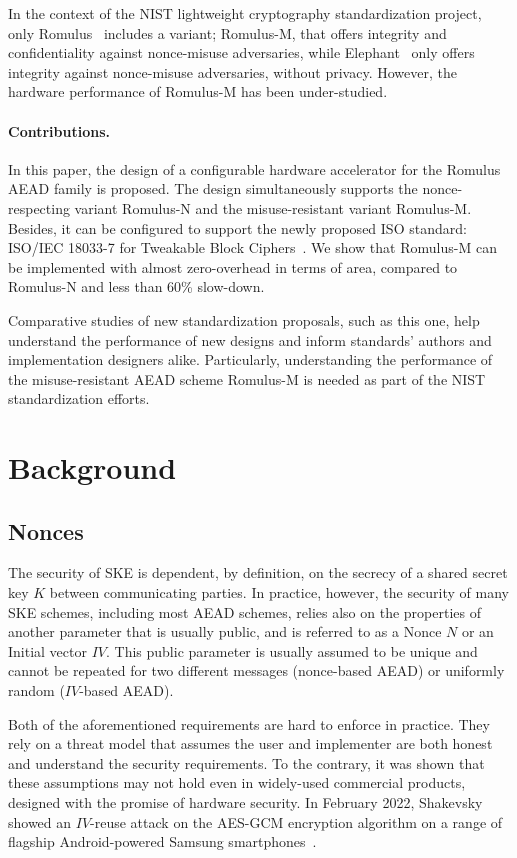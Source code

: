 \documentclass[conference]{IEEEtran}
\begin{document}
In the context of the NIST lightweight cryptography standardization project, only Romulus~\cite{iwataromulus} includes a variant; Romulus-M, that offers integrity and confidentiality against nonce-misuse adversaries, while Elephant~\cite{dobraunig2019elephant} only offers integrity against nonce-misuse adversaries, without privacy. However, the hardware performance of Romulus-M has been under-studied.

\paragraph{Contributions.} In this paper, the design of a configurable hardware accelerator for the Romulus AEAD family is proposed. The design simultaneously supports the nonce-respecting variant Romulus-N and the misuse-resistant variant Romulus-M. Besides, it can be configured to support the newly proposed ISO standard: ISO/IEC 18033-7 for Tweakable Block Ciphers~\cite{iso}. We show that Romulus-M can be implemented with almost zero-overhead in terms of area, compared to Romulus-N and less than 60\% slow-down.

Comparative studies of new standardization proposals, such as this one, help understand the performance of new designs and inform standards' authors and implementation designers alike. Particularly, understanding the performance of the misuse-resistant AEAD scheme Romulus-M is needed as part of the NIST standardization efforts.

\section{Background}

\subsection{Nonces}

The security of SKE is dependent, by definition, on the secrecy of a shared secret key $K$ between communicating parties. In practice, however, the security of many SKE schemes, including most AEAD schemes, relies also on the properties of another parameter that is usually public, and is referred to as a Nonce $N$ or an Initial vector $IV$. This public parameter is usually assumed to be unique and cannot be repeated for two different messages (nonce-based AEAD) or uniformly random ($IV$-based AEAD).

Both of the aforementioned requirements are hard to enforce in practice. They rely on a threat model that assumes the user and implementer are both honest and understand the security requirements. To the contrary, it was shown that these assumptions may not hold even in widely-used commercial products, designed with the promise of hardware security. In February 2022, Shakevsky \etal showed an $IV$-reuse attack on the AES-GCM encryption algorithm on a range of flagship Android-powered Samsung smartphones~\cite{shakevsky2022trust}.
\end{document}
